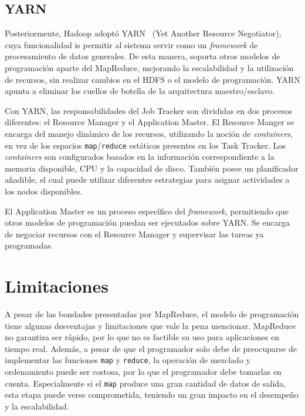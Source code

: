 \documentclass[conference]{IEEEtran}
\begin{document}
\subsection{YARN}

Posteriormente, Hadoop adoptó YARN~\cite{Yarn13} (Yet Another Resource Negotiator), cuya funcionalidad is permitir al sistema servir como un \textit{framework} de procesamiento de datos generales.
De esta manera, soporta otros modelos de programación aparte del MapReduce, mejorando la escalabilidad y la utilización de recursos, sin realizar cambios en el HDFS o el modelo de programación.
YARN apunta a eliminar los cuellos de botella de la arquitectura maestro/esclavo.


Con YARN, las responsabilidades del Job Tracker son divididas en dos procesos diferentes: el Resource Manager y el Application Master.
El Resource Manger se encarga del manejo dinámico de los recursos, utilizando la noción de \textit{containers}, en vez de los espacios \texttt{map}/\texttt{reduce} estáticos presentes en los Task Tracker.
Los \textit{containers} son configurados basados en la información correspondiente a la memoria disponible, CPU y la capacidad de disco.
También posee un planificador añadible, el cual puede utilizar diferentes estrategias para asignar actividades a los nodos disponibles.

El Application Master es un proceso específico del \textit{framework}, permitiendo que otros modelos de programación puedan ser ejecutados sobre YARN.
Se encarga de negociar recursos con el Resource Manager y supervisar las tareas ya programadas.







\section{Limitaciones}
\label{limits}

A pesar de las bondades presentadas por MapReduce, el modelo de programación tiene algunas desventajas y limitaciones que vale la pena mencionar.
MapReduce no garantiza ser rápido, por lo que no es factible su uso para aplicaciones en tiempo real.
Además, a pesar de que el programador solo debe de preocuparse de implementar las funciones \texttt{map} y \texttt{reduce}, la operación de mezclado y ordenamiento puede ser costosa, por lo que el programador debe tomarlas en cuenta.
Especialmente si el \texttt{map} produce una gran cantidad de datos de salida, esta etapa puede verse comprometida, teniendo un gran impacto en el desempeño y la escalabilidad.
\end{document}
